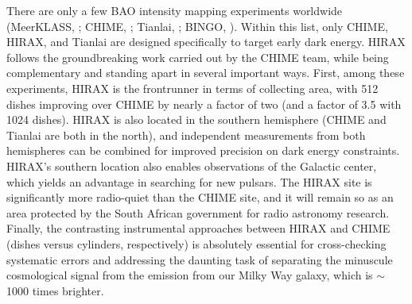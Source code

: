 \documentclass[11pt]{article}
\begin{document}
There are only a few BAO intensity mapping experiments worldwide
(MeerKLASS, \citet{Santos2017}; CHIME, \citet{Bandura16}; Tianlai,
\citet{Xu2015}; BINGO, \citet{Battye2013}).  Within this list, only
CHIME, HIRAX, and Tianlai are designed specifically to target early
dark energy.  HIRAX follows the groundbreaking work carried out by the
CHIME team, while being complementary and standing apart in several
important ways.  First, among these experiments, HIRAX is the
frontrunner in terms of collecting area, with 512 dishes improving
over CHIME by nearly a factor of two (and a factor of 3.5 with 1024
dishes).  HIRAX is also located in the southern hemisphere (CHIME and
Tianlai are both in the north), and independent measurements from both
hemispheres can be combined for improved precision on dark energy
constraints.  HIRAX's southern location also enables observations of
the Galactic center, which yields an advantage in searching for new
pulsars.  The HIRAX site is significantly more radio-quiet than the
CHIME site, and it will remain so as an area protected by the South
African government for radio astronomy research.  Finally, the
contrasting instrumental approaches between HIRAX and CHIME (dishes
versus cylinders, respectively) is absolutely essential for
cross-checking systematic errors and addressing the daunting task of
separating the minuscule cosmological signal from the emission from
our Milky Way galaxy, which is $\sim$1000 times brighter.

\end{document}
